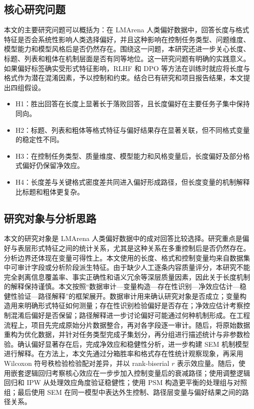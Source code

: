 \documentclass[9pt,a4paper,fontset=windows]{ctexart}
\theoremstyle{definition}
\numberwithin{equation}{section}
\begin{document}
\subsection{核心研究问题}
本文的主要研究问题可以概括为：在 LMArena 人类偏好数据中，回答长度与格式特征是否会系统性影响人类选择偏好，并且这种影响在控制任务类型、问题维度、模型能力和模型风格后是否仍然存在。围绕这一问题，本研究还进一步关心长度、标题、列表和粗体在机制层面是否有同等地位。这一研究问题有明确的实践意义。如果偏好标签确实受形式特征影响，RLHF 和 DPO 等方法在训练时就应将长度与格式作为潜在混淆因素，予以控制和约束。结合已有研究和项目报告结果，本文提出四组假设。
\begin{itemize}[leftmargin=2em]
    \item H1：胜出回答在长度上显著长于落败回答，且长度偏好在主要任务子集中保持同向。
    \item H2：标题、列表和粗体等格式特征与偏好结果存在显著关联，但不同格式变量的稳定性不同。
    \item H3：在控制任务类型、质量维度、模型能力和风格变量后，长度偏好及部分格式偏好仍保留净效应。
    \item H4：长度差与关键格式密度差共同进入偏好形成路径，但长度变量的机制解释比标题和粗体更复杂。
\end{itemize}

\subsection{研究对象与分析思路}
本文的研究对象是 LMArena 人类偏好数据中的成对回答比较选择。研究重点是偏好与表层形式特征之间的统计关系，尤其是这种关系在多重控制后是否仍然存在。分析边界还体现在变量可得性上。本文使用的长度、格式和控制变量均来自数据集中可审计字段或分析阶段派生特征。由于缺少人工逐条内容质量评分，本研究不能完全剥离信息覆盖率、事实正确性和语义冗余等深层质量因素，因此关于长度机制的解释保持谨慎。本文按照“数据审计—变量构造—存在性识别—净效应估计—稳健性验证—路径解释”的框架展开。数据审计用来确认研究对象是否成立；变量构造用来明确形式特征如何测量；存在性识别检验偏好是否存在；净效应估计考察控制混淆后偏好是否保留；路径解释进一步讨论偏好可能通过何种机制形成。在工程流程上，项目先完成原始分片数据整合，再对各字段逐一审计。随后，将原始数据重构为优化数据，并针对任务类型完成子集划分，再分组进行描述统计与非参数检验。确认偏好显著存在后，完成净效应和稳健性分析，进一步构建 SEM 机制模型进行解释。在方法上，本文先通过分箱胜率和格式存在性统计观察现象，再采用 Wilcoxon 符号秩检验检验配对差异，并以 rank-biserial \(r\) 表示效应量。随后，使用嵌套逻辑回归考察核心效应在一步步加入控制变量后的衰减路径；使用调整逻辑回归和 IPW 从处理效应角度验证稳健性；使用 PSM 构造更平衡的处理组与对照组；最后使用 SEM 在同一模型中表达外生控制、路径层变量与偏好结果之间的路径关系。
\end{document}
